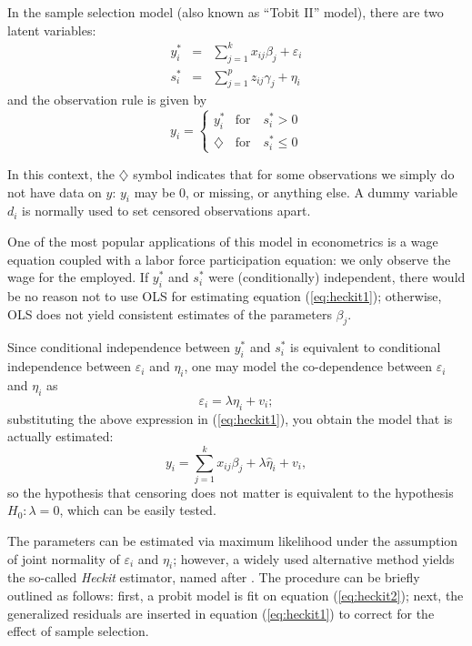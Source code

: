 In the sample selection model (also known as ``Tobit II'' model),
there are two latent variables:
%
\begin{eqnarray}
  \label{eq:heckit1}
  y^*_i & = & \sum_{j=1}^k x_{ij} \beta_j + \varepsilon_i \\
  \label{eq:heckit2}
  s^*_i & = & \sum_{j=1}^p z_{ij} \gamma_j + \eta_i 
\end{eqnarray}
%
and the observation rule is given by
%
\begin{equation}
  \label{eq:tobitII}
  y_i = \left\{ 
    \begin{array}{ll} 
      y^*_i & \mathrm{for} \quad s^*_i > 0 \\ 
      \diamondsuit & \mathrm{for} \quad s^*_i \le 0 
    \end{array}
    \right. 
\end{equation}

In this context, the $\diamondsuit$ symbol indicates that for some
observations we simply do not have data on $y$: $y_i$ may be 0, or
missing, or anything else. A dummy variable $d_i$ is normally used to
set censored observations apart.

One of the most popular applications of this model in econometrics is
a wage equation coupled with a labor force participation equation: we
only observe the wage for the employed. If $y^*_i$ and $s^*_i$ were
(conditionally) independent, there would be no reason not to use OLS
for estimating equation (\ref{eq:heckit1}); otherwise, OLS does not
yield consistent estimates of the parameters $\beta_j$.

Since conditional independence between $y^*_i$ and $s^*_i$ is
equivalent to conditional independence between $\varepsilon_i$ and
$\eta_i$, one may model the co-dependence between $\varepsilon_i$ and
$\eta_i$ as 
\[
  \varepsilon_i = \lambda \eta_i + v_i ;
\]
substituting the above expression in (\ref{eq:heckit1}), you obtain
the model that is actually estimated:
\[
  y_i = \sum_{j=1}^k x_{ij} \beta_j + \lambda \hat{\eta}_i + v_i ,
\]
so the hypothesis that censoring does not matter is equivalent to the
hypothesis $H_0: \lambda = 0$, which can be easily tested.

The parameters can be estimated via maximum likelihood under the
assumption of joint normality of $\varepsilon_i$ and $\eta_i$;
however, a widely used alternative method yields the so-called
\emph{Heckit} estimator, named after \cite{heckman79}. The procedure
can be briefly outlined as follows: first, a probit model is fit on
equation (\ref{eq:heckit2}); next, the generalized residuals are
inserted in equation (\ref{eq:heckit1}) to correct for the effect of
sample selection.

